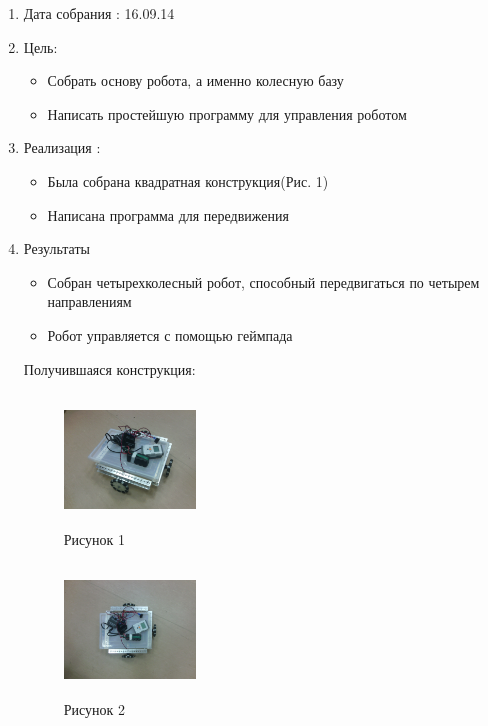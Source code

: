 
	\begin{enumerate}
		\item Дата собрания : 16.09.14
		\item Цель:
		\begin{itemize}
			\item Собрать основу робота, а именно колесную базу
			\item Написать простейшую программу для управления роботом
		\end{itemize}			
		\item Реализация :
		\begin{itemize}
			\item Была собрана квадратная конструкция(Рис. 1)
			\item Написана программа для передвижения
		\end{itemize}
		\item Результаты
		\begin{itemize}
			\item Собран четырехколесный робот, способный передвигаться по четырем направлениям
			\item Робот управляется с помощью геймпада
		\end{itemize}
		Получившаяся конструкция:
		\begin{figure} [h]
			\centering
			\begin{minipage}{0.3\linewidth}
				\includegraphics[width=35mm,height=35mm]{Days/16.09.14/1_1_robot.png}\\ Рисунок 1
			\end{minipage}
			\begin{minipage}{0.3\linewidth}
				\includegraphics[width=35mm,height=35mm]{Days/16.09.14/1_2_robot}\\ Рисунок 2
			\end{minipage}
		\end{figure}
	\end{enumerate}